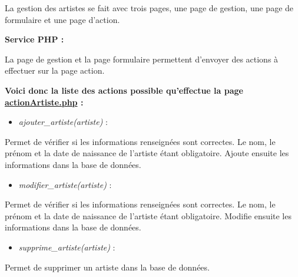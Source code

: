             \begin{paragraphe}
                La gestion des artistes se fait avec trois pages, une page de gestion, une page de formulaire et une page d'action.
            \end{paragraphe}

			\begin{paragraphe}
				\textbf{Service PHP :}
			\end{paragraphe}

			\begin{paragraphe}
                La page de gestion et la page formulaire permettent d'envoyer des actions à effectuer sur la page action.
			\end{paragraphe}

			\begin{paragraphe}
                \textbf{Voici donc la liste des actions possible qu'effectue la page \underline{actionArtiste.php} :}
            
                \begin{itemize}
                    \item \emph{ajouter\_artiste(artiste)} :
                \end{itemize}
                \begin{paragraphe}
                    Permet de vérifier si les informations renseignées sont correctes. Le nom, le prénom et la date de naissance de l'artiste étant obligatoire. Ajoute ensuite les informations dans la base de données.
                \end{paragraphe}
                
                \begin{itemize}
                    \item \emph{modifier\_artiste(artiste)} :
                \end{itemize}
                \begin{paragraphe}
                    Permet de vérifier si les informations renseignées sont correctes. Le nom, le prénom et la date de naissance de l'artiste étant obligatoire. Modifie ensuite les informations dans la base de données.
                \end{paragraphe}
                
                \begin{itemize}
                    \item \emph{supprime\_artiste(artiste)} :
                \end{itemize}
                \begin{paragraphe}
                    Permet de supprimer un artiste dans la base de données.
                \end{paragraphe}
            \end{paragraphe}

